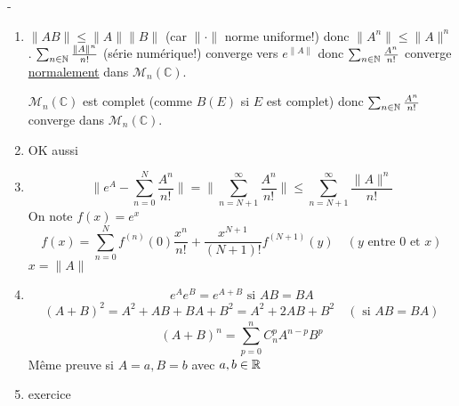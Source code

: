 \begin{preuve} -
    \begin{enumerate}
        \item 
            $\|AB\| \le \|A\|\|B\|$ (car $\| \cdot \|$ norme uniforme!) donc $\|A^n\| \le \|A\|^n$. $\sum_{n \in \mathbb{N}}^{} \frac{\|A\|^n}{n!}$ (série numérique!) converge vers $e^{\|A\|}$ donc $\sum_{n \in \mathbb{N}}^{} \frac{A^n}{n!}$ converge \underline{normalement} dans $\mathcal{M}_n(\mathbb{C})$. 
            \par
            $\mathcal{M}_n(\mathbb{C})$ est complet (comme $B(E)$ si  $E$ est complet) donc $\sum_{n \in \mathbb{N}}^{} \frac{A^n}{n!}$ converge dans $\mathcal{M}_n(\mathbb{C})$.
        \item OK aussi
        \item \[
            \|e^A - \sum_{n=0}^{N} \frac{A^n}{n!}\| = \|\sum_{n=N+1}^{\infty} \frac{A^n}{n!}\| \le \sum_{n = N+1}^{\infty} \frac{\|A\|^n}{n!}
            \] 
            On note $f(x) = e^x$
             \[
                 f(x) = \sum_{n=0}^{N} f^{(n)}(0) \frac{x^n}{n!} + \frac{x^{N+1}}{(N+1)!}f^{(N+1)}(y) \quad (y \text{ entre } 0 \text{ et } x)
            \] 
            $x = \|A\|$
        \item  
            \[
                e^Ae^B = e^{A + B} \text{ si } AB = BA
            \] 
            \begin{align*}
                (A + B)^2 = A^2 + AB + BA + B^2 = A^2 + 2AB + B^2 \quad (\text{ si } AB = BA)
            \end{align*}
            \[
                (A+B)^n = \sum_{p=0}^{n} C_n^p A^{n-p}B^p
            \] 
            Même preuve si $A = a, B = b$ avec  $a,b \in \mathbb{R}$
        \item exercice
    \end{enumerate}
\end{preuve}
